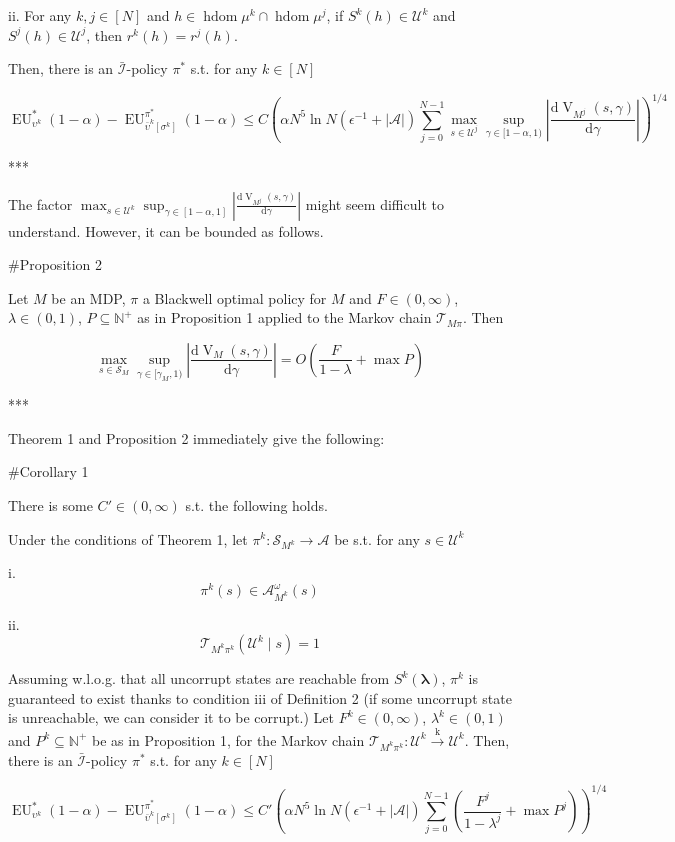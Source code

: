 \documentclass[a4paper]{article}
\newcommand{\AP}[1]{\left(#1\right)}
\newcommand{\D}{\mathrm{d}}
\newcommand{\Nats}{\mathbb{N}}
\newcommand{\Estr}{\boldsymbol{\lambda}}
\newcommand{\Abs}[1]{\left\vert #1 \right\vert}
\newcommand{\M}{\xrightarrow{\text{k}}}
\newcommand{\A}{\mathcal{A}}
\newcommand{\St}{\mathcal{S}}
\newcommand{\T}{\mathcal{T}}
\newcommand{\In}{\mathcal{I}}
\DeclareMathOperator{\HD}{hdom}
\newcommand{\UC}{\mathcal{U}}
\newcommand{\V}{\operatorname{V}}
\newcommand{\EU}{\operatorname{EU}}
\newcommand{\Pd}{P}
\begin{document}
ii. For any $k,j \in [N]$ and $h \in \HD{\mu^k} \cap \HD{\mu^j}$, if $S^k(h) \in \UC^k$ and $S^j(h) \in \UC^j$, then $r^k(h)=r^j(h)$. 

Then, there is an $\bar{\In}$-policy $\pi^*$ s.t. for any $k \in [N]$

$$\EU_{\upsilon^k}^*(1-\alpha) - \EU_{\bar{\upsilon}^k\left[\sigma^k\right]}^{\pi^*}(1-\alpha) \leq C\AP{\alpha N^5 \ln{N} \AP{\epsilon^{-1}+\Abs{\A}} \sum_{j = 0}^{N-1} \max_{s \in \UC^j} \sup_{\gamma \in [1-\alpha,1)} \Abs{\frac{\D{\V_{M^j}(s,\gamma)}}{\D\gamma}}}^{1/4}$$

***

The factor $\max_{s \in \UC^k} \sup_{\gamma \in [1-\alpha,1]} \Abs{\frac{\D{\V_{M^j}(s,\gamma)}}{\D\gamma}}$ might seem difficult to understand. However, it can be bounded as follows.

\#Proposition 2

Let $M$ be an MDP, $\pi$ a Blackwell optimal policy for $M$ and $F \in (0,\infty)$, $\lambda \in (0,1)$, $\Pd \subseteq \Nats^+$ as in Proposition 1 applied to the Markov chain $\T_{M\pi}$. Then

$$\max_{s \in \St_M} \sup_{\gamma \in [\gamma_M,1)} \Abs{\frac{\D{\V_M(s,\gamma)}}{\D\gamma}} = O\AP{\frac{F}{1-\lambda}+\max{\Pd}}$$

***

Theorem 1 and Proposition 2 immediately give the following:

\#Corollary 1

There is some $C' \in (0,\infty)$ s.t. the following holds.

Under the conditions of Theorem 1, let $\pi^k: \St_{M^k} \rightarrow \A$ be s.t. for any $s \in \UC^k$

i. $$\pi^k(s) \in \A_{M^k}^\omega(s)$$

ii. $$\T_{M^k \pi^k}\AP{\UC^k \mid s} = 1$$ 

Assuming w.l.o.g. that all uncorrupt states are reachable from $S^k(\Estr)$, $\pi^k$ is guaranteed to exist thanks to condition iii of Definition 2 (if some uncorrupt state is unreachable, we can consider it to be corrupt.) Let $F^k\in(0,\infty)$, $\lambda^k\in(0,1)$ and $\Pd^k \subseteq \Nats^+$ be as in Proposition 1, for the Markov chain $\T_{M^k\pi^k}: \UC^k \M \UC^k$. Then, there is an $\bar{\In}$-policy $\pi^*$ s.t. for any $k \in [N]$ 

$$\EU_{\upsilon^k}^*(1-\alpha) - \EU_{\bar{\upsilon}^k\left[\sigma^k\right]}^{\pi^*}(1-\alpha) \leq C'\AP{\alpha N^5 \ln{N} \AP{\epsilon^{-1}+\Abs{\A}} \sum_{j = 0}^{N-1} \AP{\frac{F^j}{1-\lambda^j}+\max{\Pd^j}}}^{1/4}$$
\end{document}
